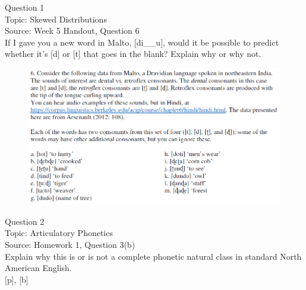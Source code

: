 \documentclass[12pt]{article}
\begin{document}
\begin{center}
\textbf{{\color{blue}{\HUGE START OF EXAM\\}}}

\textbf{{\color{blue}{\HUGE Student ID: 43119\\}}}

\textbf{{\color{blue}{\HUGE 4:40\\}}}

\end{center}
\newpage

{\large Question 1}\\

Topic: Skewed Distributions\\
Source: Week 5 Handout, Question 6\\

If I gave you a new word in Malto, [di\_\_u], would it be possible to predict whether it's [d] or [t] that goes in the blank? Explain why or why not.\\

\begin{figure}[H]
\includegraphics{../images/malto.png}
\end{figure}

\newpage

{\large Question 2}\\

Topic: Articulatory Phonetics\\
Source: Homework 1, Question 3(b)\\

Explain why this is or is not a complete phonetic natural class in standard North American English.\\

{[p]}, {[b]}


\newpage

\begin{center}
\textbf{{\color{red}{\HUGE END OF EXAM}}}\\

\end{center}
\newpage
\end{document}
